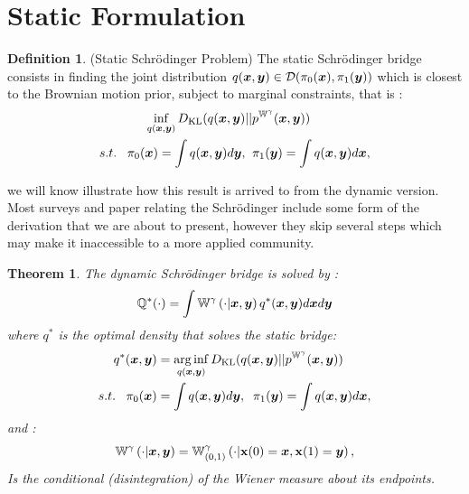 \documentclass[a4paper,12pt,twoside,openright]{report}
\newtheorem{theorem}{Theorem}
\theoremstyle{definition}
\newtheorem{definition}{Definition}[section]
\begin{document}
\section{Static Formulation}
\begin{definition}\label{def:static_bridge}
    (Static Schrödinger Problem) The static Schrödinger bridge consists in finding the joint distribution $q({\bm{x}}, {\bm{y}}) \in {\mathcal{D}}(\pi_0({\bm{x}}), \pi_1({\bm{y}}))$ which is closest to the Brownian motion prior, subject to marginal constraints, that is :
    \begin{align}\label{eq:static_bridge}
        \inf_{q({\bm{x}},{\bm{y}})} D_{\mathrm{KL}} (q({\bm{x}},{\bm{y}})  &|| p^{\mathbb{W}^{\gamma}}({\bm{x}},{\bm{y}})) \nonumber \\
        s.t. \;\;\; \pi_0({\bm{x}}) = \int q({\bm{x}},{\bm{y}}) d{\bm{y}}, &\;\;\pi_1({\bm{y}}) = \int q({\bm{x}},{\bm{y}}) d{\bm{x}},
    \end{align}
\end{definition}
we will know illustrate how this result is arrived to from the dynamic version. Most surveys and paper relating the Schrödinger include some form of the derivation that we are about to present, however they skip several steps which may make it inaccessible to a more applied community. 
\begin{theorem}\citep{follmer1988random}
    The dynamic Schrödinger bridge is solved by :
\begin{align}
    {\mathbb{Q}}^{*} (\cdot) =  \int \mathbb{W}^{\gamma} \left(\cdot | {\bm{x}}, {\bm{y}}\right)  q^{*}({\bm{x}},{\bm{y}}) d{\bm{x}} d{\bm{y}} 
\end{align}
    where $q^*$ is the optimal density that solves the static bridge:
    \begin{align*}
        q^{*}({\bm{x}},{\bm{y}})& = \operatorname*{arg\,inf}_{q({\bm{x}},{\bm{y}})} D_{\mathrm{KL}} (q({\bm{x}},{\bm{y}})  || p^{\mathbb{W}^{\gamma}}({\bm{x}},{\bm{y}}))  \\
        s.t. \;\;\; \pi_0({\bm{x}}) &= \int q({\bm{x}},{\bm{y}}) d{\bm{y}}, \;\;\pi_1({\bm{y}}) = \int q({\bm{x}},{\bm{y}}) d{\bm{x}},
    \end{align*}
    and :
    \begin{align*}
        \mathbb{W}^{\gamma} \left(\cdot | {\bm{x}}, {\bm{y}}\right)  = \mathbb{W}_{(0,1)}^{\gamma}\left(\cdot | {\mathbf{x}}(0) ={\bm{x}}, {\mathbf{x}}(1) ={\bm{y}}\right),
    \end{align*}
    Is the conditional (disintegration) of the Wiener measure about its endpoints.
\end{theorem} %
\end{document}

